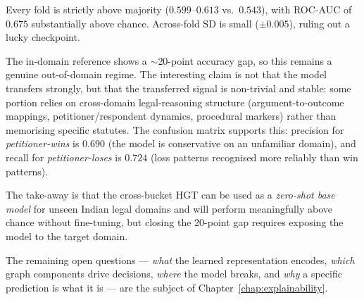 Every fold is strictly above majority ($0.599$--$0.613$ vs.\ $0.543$), with ROC-AUC of $0.675$ substantially above chance. Across-fold SD is small ($\pm 0.005$), ruling out a lucky checkpoint.

The in-domain reference shows a $\sim$20-point accuracy gap, so this remains a genuine out-of-domain regime. The interesting claim is not that the model transfers strongly, but that the transferred signal is non-trivial and stable: some portion relies on cross-domain legal-reasoning structure (argument-to-outcome mappings, petitioner/respondent dynamics, procedural markers) rather than memorising specific statutes. The confusion matrix supports this: precision for \emph{petitioner-wins} is $0.690$ (the model is conservative on an unfamiliar domain), and recall for \emph{petitioner-loses} is $0.724$ (loss patterns recognised more reliably than win patterns).

The take-away is that the cross-bucket HGT can be used as a \emph{zero-shot base model} for unseen Indian legal domains and will perform meaningfully above chance without fine-tuning, but closing the 20-point gap requires exposing the model to the target domain.

\vspace{0.5em}
\noindent The remaining open questions --- \emph{what} the learned representation encodes, \emph{which} graph components drive decisions, \emph{where} the model breaks, and \emph{why} a specific prediction is what it is --- are the subject of Chapter~\ref{chap:explainability}.

\endinput
